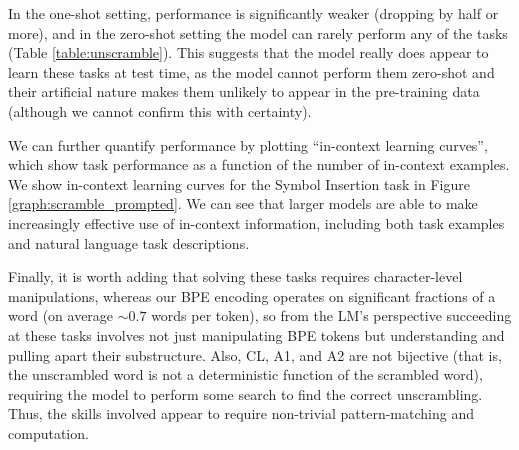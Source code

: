 In the one-shot setting, performance is significantly weaker (dropping by half or more), and in the zero-shot setting the model can rarely perform any of the tasks (Table \ref{table:unscramble}).  This suggests that the model really does appear to learn these tasks at test time, as the model cannot perform them zero-shot and their artificial nature makes them unlikely to appear in the pre-training data (although we cannot confirm this with certainty).

We can further quantify performance by plotting ``in-context learning curves'', which show task performance as a function of the number of in-context examples.  We show in-context learning curves for the Symbol Insertion task in Figure \ref{graph:scramble_prompted}.  We can see that larger models are able to make increasingly effective use of in-context information, including both task examples and natural language task descriptions.

Finally, it is worth adding that solving these tasks requires character-level manipulations, whereas our BPE encoding operates on significant fractions of a word (on average $\sim0.7$ words per token), so from the LM’s perspective succeeding at these tasks involves not just manipulating BPE tokens but understanding and pulling apart their substructure. Also, CL, A1, and A2 are not bijective (that is, the unscrambled word is not a deterministic function of the scrambled word), requiring the model to perform some search to find the correct unscrambling. Thus, the skills involved appear to require non-trivial pattern-matching and computation.
